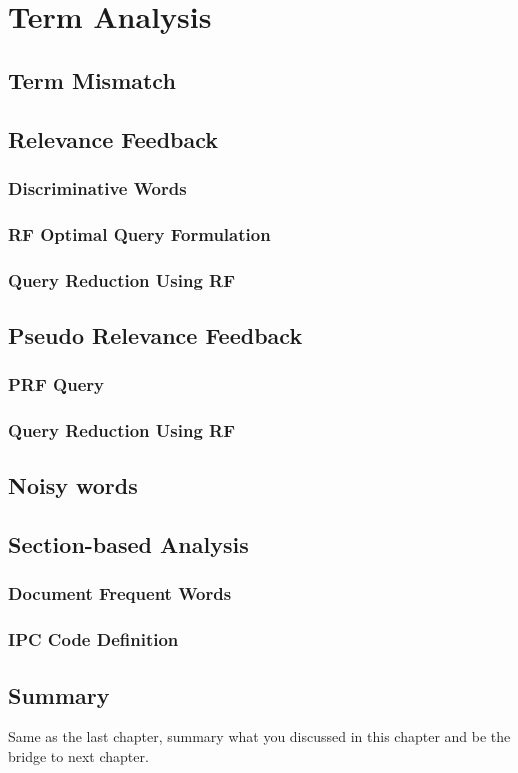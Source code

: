\chapter{Term Analysis}
\label{cha:analysis}

\section{Term Mismatch}
\label{sec:termmismatch}

\section{Relevance Feedback}

\subsection{Discriminative Words}
\label{sec:discriminative}

\subsection{RF Optimal Query Formulation}
\label{sec:formulation}

\subsection{Query Reduction Using RF}

\section{Pseudo Relevance Feedback}

\subsection{PRF Query}
\subsection{Query Reduction Using RF}

\section{Noisy words}

\section{Section-based Analysis}

\subsection{Document Frequent Words}

\subsection{IPC Code Definition}

\section{Summary}
Same as the last chapter, summary what you discussed in this chapter and
be the bridge to next chapter.
